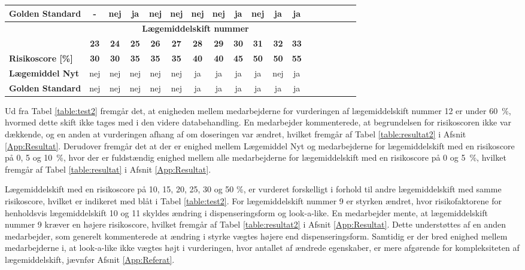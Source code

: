 \begin{longtable}{|l|c|c|c|c|c|c|c|c|c|c|c|c|c|c|c|c|c|}
\cellcolor[HTML]{C0C0C0}\textbf{Golden Standard} & \cellcolor[HTML]{F6E6E5} - & nej & \cellcolor[HTML]{32CB00}ja & nej & nej & nej & \cellcolor[HTML]{32CB00}nej & \cellcolor[HTML]{32CB00} ja & \cellcolor[HTML]{32CB00}nej & \cellcolor[HTML]{32CB00}ja & ja \\ \hline
\rowcolor[HTML]{C0C0C0} & \multicolumn{11}{|c|}{\textbf{Lægemiddelskift nummer}} \\ 
\rowcolor[HTML]{C0C0C0} & \textbf{23} & \textbf{24} & \textbf{25} & \textbf{26} & \textbf{27} & \textbf{28} &  \textbf{29} & \textbf{30} & \textbf{31} & \textbf{32} & \textbf{33}  \\ \cline{1-10}
\cellcolor[HTML]{C0C0C0}\textbf{Risikoscore [\%]} & \textbf{30} & \textbf{30} & \textbf{35} & \textbf{35} & \textbf{35} & \textbf{40} & \textbf{40} & \textbf{45} & \textbf{50} & \cellcolor[HTML]{34CDF9}\textbf{50} & \textbf{55} \\ \hline 
\cellcolor[HTML]{C0C0C0}\textbf{Lægemiddel Nyt} & nej & nej & nej & nej & nej & ja & ja & ja & ja & \cellcolor[HTML]{32CB00} nej & ja\\ \hline
\cellcolor[HTML]{C0C0C0}\textbf{Golden Standard} & nej & nej & nej & nej & nej & ja & ja& ja & ja&\cellcolor[HTML]{32CB00}ja & ja \\\hline
\end{longtable}
\vspace{0.5cm}

Ud fra Tabel \ref{table:test2} fremgår det, at enigheden mellem medarbejderne for vurderingen af lægemiddelskift nummer 12 er under 60~\%, hvormed dette skift ikke tages med i den videre databehandling. En medarbejder kommenterede, at begrundelsen for risikoscoren ikke var dækkende, og en anden at vurderingen  afhang af om doseringen var ændret, hvilket fremgår af Tabel \ref{table:resultat2} i Afsnit \ref{App:Resultat}. %
Derudover fremgår det at der er enighed mellem Lægemiddel Nyt og medarbejderne for lægemiddelskift med en risikoscore på 0, 5 og 10~\%, hvor der er  fuldstændig enighed mellem alle medarbejderne for lægemiddelskift med en risikoscore på 0 og 5~\%, hvilket fremgår af Tabel \ref{table:resultat} i Afsnit \ref{App:Resultat}.

Lægemiddelskift med en risikoscore på 10, 15, 20, 25, 30 og 50 \%, er vurderet forskelligt i forhold til andre lægemiddelskift med samme risikoscore, hvilket er indikeret med blåt i Tabel \ref{table:test2}. For lægemiddelskift nummer 9 er styrken ændret, hvor risikofaktorene for henholdsvis lægemiddelskift 10 og 11 skyldes ændring i dispenseringsform og look-a-like. En medarbejder mente, at lægemiddelskift nummer 9 kræver en højere risikoscore, hvilket fremgår af Tabel \ref{table:resultat2} i Afsnit \ref{App:Resultat}. Dette understøttes af en anden medarbejder, som generelt kommenterede at ændring i styrke vægtes højere end dispenseringsform. Samtidig er der bred enighed mellem medarbejderne i, at look-a-like ikke vægtes højt i vurderingen, hvor antallet af ændrede egenskaber,  er mere afgørende for kompleksiteten af lægemiddelskift, jævnfør Afsnit \ref{App:Referat}. 


